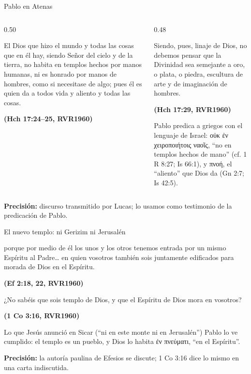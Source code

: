 \documentclass[hyperref={bookmarks=false},aspectratio=169]{beamer}
\newcommand{\grc}[1]{\foreignlanguage{ancientgreek}{#1}}
\newcommand{\fuente}[1]{\par\hfill{\upshape\bfseries\footnotesize\textcolor{azul}{#1}}}
\newcommand{\precision}[1]{{\footnotesize\color{gris}\textbf{Precisión:} #1}}
\begin{document}
\begin{frame}{Pablo en Atenas}
\begin{columns}[t,onlytextwidth]
\begin{column}{0.50\textwidth}
\begin{cita}El Dios que hizo el mundo y todas las cosas que en él hay, siendo Señor del cielo y de la tierra, no habita en templos hechos por manos humanas, ni es honrado por manos de hombres, como si necesitase de algo; pues él es quien da a todos vida y aliento y todas las cosas.\fuente{(Hch 17:24--25, RVR1960)}\end{cita}
\end{column}
\begin{column}{0.48\textwidth}
\begin{cita}Siendo, pues, linaje de Dios, no debemos pensar que la Divinidad sea semejante a oro, o plata, o piedra, escultura de arte y de imaginación de hombres.\fuente{(Hch 17:29, RVR1960)}\end{cita}
\small Pablo predica a griegos con el lenguaje de Israel: \grc{οὐκ ἐν χειροποιήτοις ναοῖς}, ``no en templos hechos de mano'' (cf. 1 R 8:27; Is 66:1), y \grc{πνοή}, el ``aliento'' que Dios da (Gn 2:7; Is 42:5).
\end{column}
\end{columns}\par\smallskip
\precision{discurso transmitido por Lucas; lo usamos como testimonio de la predicación de Pablo.}
\end{frame}

\begin{frame}{El nuevo templo: ni Gerizim ni Jerusalén}
\begin{cita}porque por medio de él los unos y los otros tenemos entrada por un mismo Espíritu al Padre\ldots{} en quien vosotros también sois juntamente edificados para morada de Dios en el Espíritu.\fuente{(Ef 2:18, 22, RVR1960)}\end{cita}
\begin{cita}¿No sabéis que sois templo de Dios, y que el Espíritu de Dios mora en vosotros?\fuente{(1 Co 3:16, RVR1960)}\end{cita}
\small\RaggedRight Lo que Jesús anunció en Sicar (``ni en este monte ni en Jerusalén'') Pablo lo ve cumplido: el templo es un pueblo, y Dios lo habita \grc{ἐν πνεύματι}, ``en el Espíritu''.\par\smallskip
\precision{la autoría paulina de Efesios se discute; 1 Co 3:16 dice lo mismo en una carta indiscutida.}
\end{frame}
\end{document}
